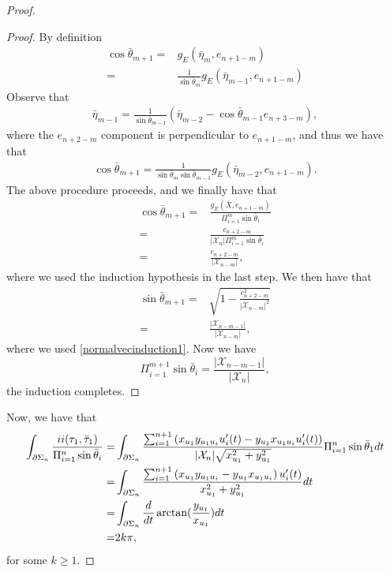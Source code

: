\documentclass[10pt,a4paper]{amsart}
\newcommand{\RN}[1]{%
  \textup{\uppercase\expandafter{\romannumeral#1}}%
}
\begin{document}
\begin{proof}
\begin{proof}
By definition 
\begin{align*}
    \cos\bar{\theta}_{m+1}=&g_E(\bar{\eta}_{m},e_{n+1-m})\\
                          =&\frac{1}{\sin\bar{\theta}_m}g_E(\bar{\eta}_{m-1},e_{n+1-m})
\end{align*}
Observe that 
\begin{align*}
    \bar{\eta}_{m-1}=\frac{1}{\sin\bar{\theta}_{m-1}}\left(\bar{\eta}_{m-2}-\cos\bar{\theta}_{m-1}e_{n+3-m}\right),
\end{align*}
where the $e_{n+2-m}$ component is perpendicular to $e_{n+1-m}$, and thus we have that
\begin{align*}
    \cos\bar{\theta}_{m+1}=\frac{1}{\sin\bar{\theta}_{m}\sin\bar{\theta}_{m-1}}g_E(\bar{\eta}_{m-2},e_{n+1-m}).
\end{align*}
The above procedure proceeds, and we finally have that
\begin{align*}
    \cos\bar{\theta}_{m+1}=&\frac{g_E(\bar{X},e_{n+1-m})}{\Pi_{i=1}^{m}\sin\bar{\theta}_i}\\
    =&\frac{c_{n+2-m}}{|\mathcal{X}_n|\Pi_{i=1}^m\sin\bar{\theta}_i}\\
    =&\frac{c_{n+2-m}}{|\mathcal{X}_{n-m}|},
\end{align*}
where we used the induction hypothesis in the last step.
We then have that
\begin{align*}
    \sin\bar{\theta}_{m+1}=&\sqrt{1-\frac{c_{n+2-m}^2}{|\mathcal{X}_{n-m}|^2}}\\
    =&\frac{|\mathcal{X}_{n-m-1}|}{|\mathcal{X}_{n-m}|},
\end{align*}
where we used \eqref{normalvecinduction1}.
Now we have 
\[
\Pi_{i=1}^{m+1}\sin\bar{\theta}_i=\frac{|\mathcal{X}_{n-m-1}|}{|\mathcal{X}_n|},
\]
the induction completes.
\end{proof}
Now, we have that
\begin{align*}
    \int_{\partial\Sigma_n}\frac{\RN{2}(\tau_1,\bar{\tau}_1)}{\Pi_{i=1}^{n}\sin\bar{\theta}_i}=&\int_{\partial\Sigma_n}
    \frac{\sum_{i=1}^{n+1}\left(x_{u_1}y_{u_1u_i}u_i'(t)-y_{u_1}x_{u_1u_{i}}u_i'(t)\right)}{|\mathcal{X}_n|\sqrt{x_{u_1}^2+y_{u_1}^2}}\Pi_{i=1}^{n}\sin\bar{\theta}_1dt\\
    =&\int_{\partial\Sigma_n}\frac{\sum_{i=1}^{n+1}\left(x_{u_1}y_{u_1u_i}-y_{u_1}x_{u_1u_i}\right)u_i'(t)}{x_{u_1}^2+y_{u_1}^2}dt\\
    =&\int_{\partial\Sigma_n}\frac{d}{dt}\arctan(\frac{y_{u_1}}{x_{u_1}})dt\\
    =&2k\pi,
\end{align*}
for some $k\geq 1$.
\end{proof}
\end{document}
